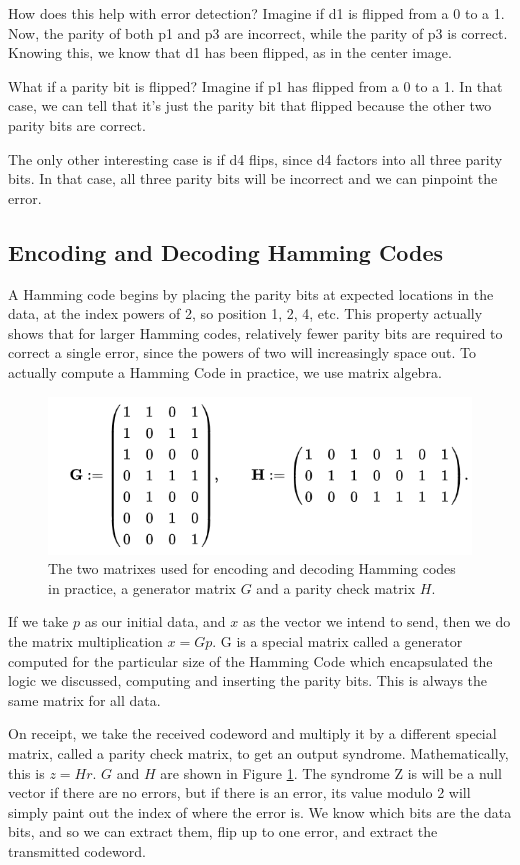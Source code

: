 \documentclass[12pt]{article}
\begin{document}
How does this help with error detection? Imagine if d1 is flipped from a 0 to a 1. Now, the parity of both p1 and p3 are incorrect, while the parity of p3 is correct. Knowing this, we know that d1 has been flipped, as in the center image.

What if a parity bit is flipped? Imagine if p1 has flipped from a 0 to a 1. In that case, we can tell that it's just the parity bit that flipped because the other two parity bits are correct.

The only other interesting case is if d4 flips, since d4 factors into all three parity bits. In that case, all three parity bits will be incorrect and we can pinpoint the error. \cite{wolf}

\subsection{Encoding and Decoding Hamming Codes}

A Hamming code begins by placing the parity bits at expected locations in the data, at the index powers of 2, so position 1, 2, 4, etc. This property actually shows that for larger Hamming codes, relatively fewer parity bits are required to correct a single error, since the powers of two will increasingly space out. To actually compute a Hamming Code in practice, we use matrix algebra. 

\begin{figure}[h!]
 \centering
 \includegraphics[width=.5\textwidth]{img/matrix.png}
 \caption{The two matrixes used for encoding and decoding Hamming codes in practice, a generator matrix $G$ and a parity check matrix $H$. \cite{wiki}}
 \label{fig:matrix}	
 \end{figure}

If we take $p$ as our initial data, and $x$ as the vector we intend to send, then we do the matrix multiplication $x = Gp$. G is a special matrix called a generator computed for the particular size of the Hamming Code which encapsulated the logic we discussed, computing and inserting the parity bits. This is always the same matrix for all data.

On receipt, we take the received codeword and multiply it by a different special matrix, called a parity check matrix, to get an output syndrome. Mathematically, this is $z = Hr$. $G$ and $H$ are shown in Figure \ref{fig:matrix}. The syndrome Z is will be a null vector if there are no errors, but if there is an error, its value modulo 2 will simply paint out the index of where the error is. We know which bits are the data bits, and so we can extract them, flip up to one error, and extract the transmitted codeword. \cite{wolf}
\end{document}
